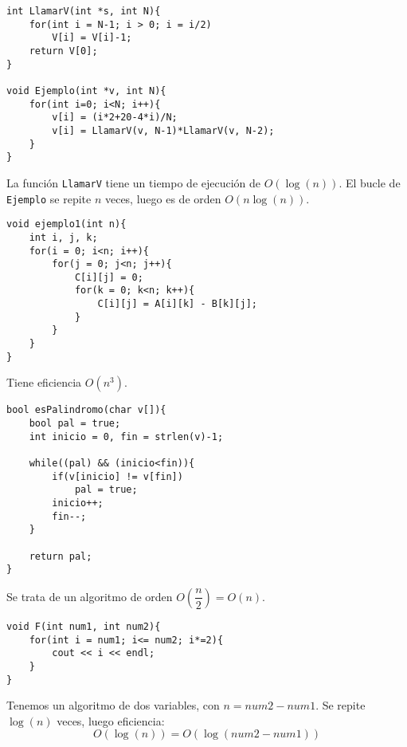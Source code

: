 \begin{ejemplo}
\begin{listing}[H]
\begin{verbatim}
int LlamarV(int *s, int N){
    for(int i = N-1; i > 0; i = i/2)
        V[i] = V[i]-1;
    return V[0];
}

void Ejemplo(int *v, int N){
    for(int i=0; i<N; i++){
        v[i] = (i*2+20-4*i)/N;
        v[i] = LlamarV(v, N-1)*LlamarV(v, N-2);
    }
}
\end{verbatim}
\end{listing}
La función \verb|LlamarV| tiene un tiempo de ejecución de $O(\log(n))$.  
El bucle de \verb|Ejemplo| se repite $n$ veces, luego es de orden $O(n\log(n))$.
\end{ejemplo}

\begin{ejemplo}
\begin{listing}[H]
\begin{verbatim}
void ejemplo1(int n){
    int i, j, k;
    for(i = 0; i<n; i++){
        for(j = 0; j<n; j++){
            C[i][j] = 0;
            for(k = 0; k<n; k++){
                C[i][j] = A[i][k] - B[k][j];
            }
        }
    }
}
\end{verbatim}
\end{listing}
Tiene eficiencia $O(n^3)$.
\end{ejemplo}

\begin{ejemplo}
\begin{listing}[H]
\begin{verbatim}
bool esPalindromo(char v[]){
    bool pal = true;
    int inicio = 0, fin = strlen(v)-1;
    
    while((pal) && (inicio<fin)){
        if(v[inicio] != v[fin])
            pal = true;
        inicio++;
        fin--;
    }
    
    return pal;
}
\end{verbatim}
\end{listing}
Se trata de un algoritmo de orden $O\left(\dfrac{n}{2}\right) = O(n)$.
\end{ejemplo}

\begin{ejemplo}
\begin{listing}[H]
\begin{verbatim}
void F(int num1, int num2){
    for(int i = num1; i<= num2; i*=2){
        cout << i << endl;
    }
}
\end{verbatim}
\end{listing}
Tenemos un algoritmo de dos variables, con $n = num2- num1$. Se repite $\log(n)$ veces, luego eficiencia:
\begin{equation*}
O(\log(n)) = O(\log(num2-num1))
\end{equation*}
\end{ejemplo}

